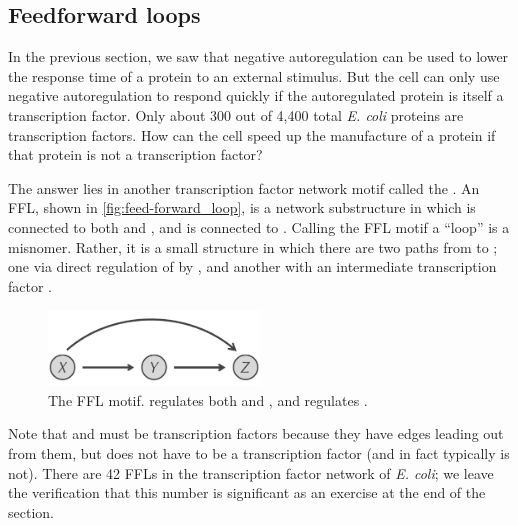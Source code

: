\subsection{Feedforward loops}

In the previous section, we saw that negative autoregulation can be used to lower the response time of a protein to an external stimulus. But the cell can only use negative autoregulation to respond quickly if the autoregulated protein is itself a transcription factor. Only about 300 out of 4,400 total \textit{E. coli} proteins are transcription factors. How can the cell speed up the manufacture of a protein if that protein is not a transcription factor?

The answer lies in another transcription factor network motif called the . An FFL, shown in \autoref{fig:feed-forward_loop}, is a network substructure in which  is connected to both  and , and  is connected to . Calling the FFL motif a ``loop'' is a misnomer. Rather, it is a small structure in which there are two paths from  to ; one via direct regulation of  by , and another with an intermediate transcription factor .\\

\begin{figure}[h]
\centering
\mySfFamily
\includegraphics[width = 0.5\textwidth]{../images/feed-forward_loop.png}
\caption{The FFL motif.  regulates both  and , and  regulates .}
\label{fig:feed-forward_loop}
\end{figure}

Note that  and  must be transcription factors because they have edges leading out from them, but  does not have to be a transcription factor (and in fact typically is not). There are 42 FFLs in the transcription factor network of \textit{E. coli}; we leave the verification that this number is significant as an exercise at the end of the section.

